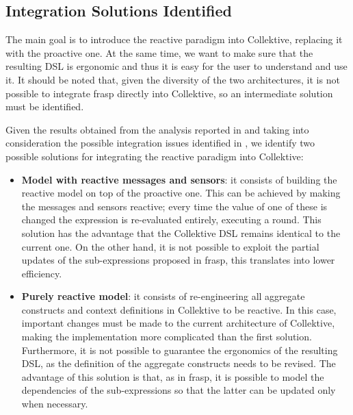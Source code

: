 

\subsection{Integration Solutions Identified}
\label{subsection:integration-solutions-identified}

The main goal is to introduce the reactive paradigm into Collektive, replacing it with the proactive one. At the same time, we want to make sure that the resulting DSL is ergonomic and thus it is easy for the user to understand and use it. It should be noted that, given the diversity of the two architectures, it is not possible to integrate \ac{frasp} directly into Collektive, so an intermediate solution must be identified.

Given the results obtained from the analysis reported in  and taking into consideration the possible integration issues identified in , we identify two possible solutions for integrating the reactive paradigm into Collektive:

\begin{itemize}
    \item \textbf{Model with reactive messages and sensors}: it consists of building the reactive model on top of the proactive one. This can be achieved by making the messages and sensors reactive; every time the value of one of these is changed the expression is re-evaluated entirely, executing a round. This solution has the advantage that the Collektive DSL remains identical to the current one. On the other hand, it is not possible to exploit the partial updates of the sub-expressions proposed in \ac{frasp}, this translates into lower efficiency.
    \item \textbf{Purely reactive model}: it consists of re-engineering all aggregate constructs and context definitions in Collektive to be reactive. In this case, important changes must be made to the current architecture of Collektive, making the implementation more complicated than the first solution. Furthermore, it is not possible to guarantee the ergonomics of the resulting DSL, as the definition of the aggregate constructs needs to be revised. The advantage of this solution is that, as in \ac{frasp}, it is possible to model the dependencies of the sub-expressions so that the latter can be updated only when necessary.
\end{itemize}
